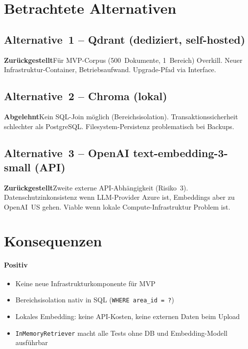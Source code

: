 \documentclass[a4paper, 11pt, oneside]{report}
\newcommand{\code}[1]{\texttt{\small #1}}
\newcommand{\abgelehnt}{\colorbox{depbg}{\small\bfseries\color{warnframe}Abgelehnt}\;}
\newcommand{\zurueckgestellt}{\colorbox{notebg}{\small\bfseries\color{noteframe}Zur\"{u}ckgestellt}\;}
\begin{document}
\section{Betrachtete Alternativen}

\subsection{Alternative~1 -- Qdrant (dediziert, self-hosted)}

\zurueckgestellt Für MVP-Corpus (500~Dokumente, 1~Bereich) Overkill.
Neuer Infrastruktur-Container, Betriebsaufwand. Upgrade-Pfad via Interface.

\subsection{Alternative~2 -- Chroma (lokal)}

\abgelehnt Kein SQL-Join möglich (Bereichsisolation). Transaktionssicherheit
schlechter als PostgreSQL. Filesystem-Persistenz problematisch bei Backups.

\subsection{Alternative~3 -- OpenAI text-embedding-3-small (API)}

\zurueckgestellt Zweite externe API-Abhängigkeit (Risiko~3).
Datenschutzinkonsistenz wenn LLM-Provider Azure ist, Embeddings aber
zu OpenAI~US gehen. Viable wenn lokale Compute-Infrastruktur Problem ist.

\section{Konsequenzen}

\paragraph{Positiv}
\begin{itemize}
  \item Keine neue Infrastrukturkomponente für MVP
  \item Bereichsisolation nativ in SQL (\code{WHERE area\_id = ?})
  \item Lokales Embedding: keine API-Kosten, keine externen Daten beim Upload
  \item \code{InMemoryRetriever} macht alle Tests ohne DB und Embedding-Modell ausführbar
\end{itemize}
\end{document}
